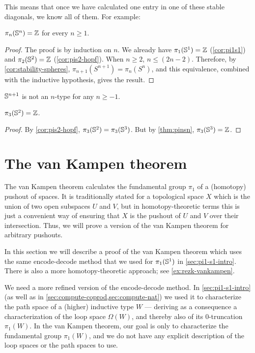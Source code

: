 This means that once we have calculated one entry in one of these stable
diagonals, we know all of them.  For example:
\begin{thm}\label{thm:pinsn}
$\pi_n(\mathbb{S}^n)=\mathbb{Z}$ for every $n\geq 1$.
\end{thm}

\begin{proof}
The proof is by induction on $n$.  We already have $\pi_1(\mathbb{S} ^1) = \mathbb{Z}$
(\cref{cor:pi1s1}) and $\pi_2(\mathbb{S} ^2) = \mathbb{Z}$ (\cref{cor:pis2-hopf}).
When $n \ge 2$, $n \le (2n - 2)$. Therefore, by
\cref{cor:stability-spheres}, $\pi_{n+1}(S^{n+1}) = \pi_{n}(S^{n})$, and
this equivalence, combined with the inductive hypothesis, gives the result.
\end{proof}

\begin{cor}
  $\mathbb{S}^{n+1}$ is not an $n$-type for any $n\ge -1$.
\end{cor}

\begin{cor}\label{thm:pi3s2}
  $\pi_3(\mathbb{S}^2)=\mathbb{Z}$.
\end{cor}
\begin{proof}
  By \cref{cor:pis2-hopf}, $\pi_3(\mathbb{S}^2) = \pi_3(\mathbb{S}^3)$.
  But by \cref{thm:pinsn}, $\pi_3(\mathbb{S}^3) = \mathbb{Z}$.
\end{proof}

\section{The van Kampen theorem}
\label{sec:van-kampen}

%
%

%
The van Kampen theorem calculates the fundamental group $\pi_1$ of a (homotopy) pushout of spaces.
It is traditionally stated for a topological space $X$ which is the union of two open subspaces $U$ and $V$, but in homotopy-theoretic terms this is just a convenient way of ensuring that $X$ is the pushout of $U$ and $V$ over their intersection.
Thus, we will prove a version of the van Kampen theorem for arbitrary pushouts.

In this section we will describe a proof of the van Kampen theorem which uses the same encode-decode method that we used for $\pi_1(\mathbb{S}^1)$ in \cref{sec:pi1-s1-intro}.
There is also a more homotopy-theoretic approach; see \cref{ex:rezk-vankampen}.

We need a more refined version of the encode-decode method.
In \cref{sec:pi1-s1-intro} (as well as in \cref{sec:compute-coprod,sec:compute-nat}) we used it to characterize the path space of a (higher) inductive type $W$ --- deriving as a consequence a characterization of the loop space $\Omega(W)$, and thereby also of its 0-truncation $\pi_1(W)$.
In the van Kampen theorem, our goal is only to characterize the fundamental group $\pi_1(W)$, and we do not have any explicit description of the loop spaces or the path spaces to use.

